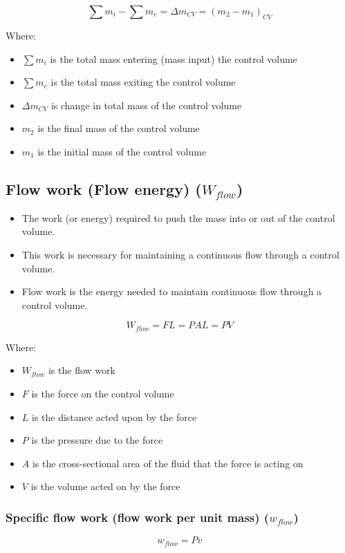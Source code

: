 \documentclass[11pt]{article}
\begin{document}
\[\sum m_{i} - \sum m_{e} = \Delta m_{CV} = \left(m_2 - m_1 \right)_{CV}\]

Where:
\begin{itemize}
\item \(\sum m_{i}\) is the total mass entering (mass input) the control volume
\item \(\sum m_{e}\) is the total mass exiting the control volume
\item \(\Delta m_{CV}\) is change in total mass of the control volume
\item \(m_2\) is the final mass of the control volume
\item \(m_1\) is the initial mass of the control volume
\end{itemize}

\newpage
\subsection{Flow work (Flow energy) (\(W_{flow}\))}
\label{sec:org946d840}
\begin{itemize}
\item The work (or energy) required to push the mass into or out of the control volume.
\item This work is necessary for maintaining a continuous flow through a control volume.
\item Flow work is the energy needed to maintain continuous flow through a control volume.
\end{itemize}

\[W_{flow} = FL = PAL = PV\]

Where:
\begin{itemize}
\item \(W_{flow}\) is the flow work
\item \(F\) is the force on the control volume
\item \(L\) is the distance acted upon by the force
\item \(P\) is the pressure due to the force
\item \(A\) is the cross-sectional area of the fluid that the force is acting on
\item \(V\) is the volume acted on by the force
\end{itemize}
\subsubsection{Specific flow work (flow work per unit mass) (\(w_{flow}\))}
\label{sec:org669e45e}
\[w_{flow} = Pv\]
\end{document}
